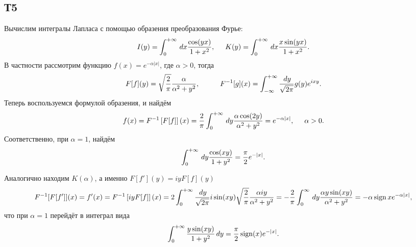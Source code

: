 \subsection{Т5}

Вычислим интегралы Лапласа с помощью образения преобразования Фурье:
\begin{equation*}
    I(y) = \int_{0}^{+\infty}  \, d x \frac{\cos (yx)}{1 + x^2},
    \hspace{5 mm}
    K(y) = \int_{0}^{+\infty} \, d x \frac{x \sin (yx)}{1 + x^2}.
\end{equation*}
В частности рассмотрим функцию $f(x) = e^{-\alpha |x|}$, где $\alpha > 0$, тогда
\begin{equation*}
    F[f](y) = \sqrt{\frac{2}{\pi}} \frac{\alpha}{\alpha^2 + y^2},
    \hspace{10 mm}
    F^{-1}[g] (x) = \int_{-\infty}^{+\infty} 
    \frac{\d y}{\sqrt{2\pi}} g(y) e^{ixy}.
\end{equation*}
Теперь воспользуемся формулой образения, и найдём
\begin{align*}
    f(x) 
    =
    F^{-1} \left[
        F[f]
    \right](x) 
    =
    \frac{2}{\pi}
     \int_{0}^{+\infty} 
     \, d y \frac{\alpha \cos (2 y)}{\alpha^2 + y^2} = e^{-\alpha |x|}, \hspace{5 mm} \alpha > 0.
\end{align*}
Соответственно, при $\alpha = 1$, найдём
\begin{equation*}
    \int_{0}^{+\infty} \, d y \frac{\cos(xy)}{1 + y^2} = \frac{\pi}{2} e^{-|x|}.
\end{equation*}

Аналогично находим $K(\alpha)$, а именно $F[f'](y) = iy F[f](y)$
\begin{equation*}
    F^{-1} [F[f']](x) = f'(x) = F^{-1}\left[
        iy F[f]
    \right] (x) = 2 \int_0^{+\infty} \frac{\, d y}{\sqrt{2\pi}} i \sin (xy) \sqrt{\frac{2}{\pi}} \frac{\alpha i y}{\alpha^2 + y^2} = - \frac{2}{\pi} \int_0^\infty \, d y \frac{\alpha y \sin (xy)}{\alpha^2 + y^2} = - \alpha \mathop{\mathrm{sign}}\nolimits x e^{-\alpha |x|},
\end{equation*}
что при $\alpha = 1$ перейдёт в интеграл вида
\begin{equation*}
    \int_0^{+\infty} \frac{y \sin (xy)}{1 + y^2} \, d y = \frac{\pi}{2} \mathop{\mathrm{sign}}\nolimits (x) e^{-|x|}.
\end{equation*}